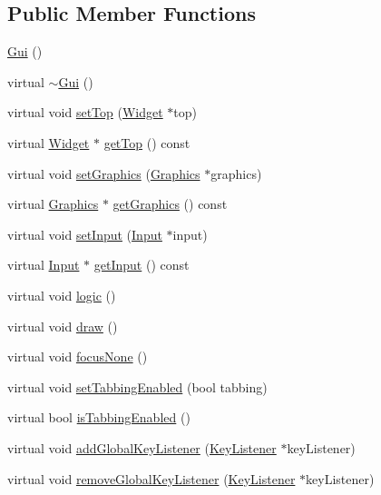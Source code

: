 \subsection*{Public Member Functions}
\begin{DoxyCompactItemize}
\item 
\hyperlink{classgcn_1_1Gui_ada0ae56b26099a1bbb70fc4bb8d77da1}{Gui} ()
\item 
virtual \hyperlink{classgcn_1_1Gui_a89c4b4fafd6bc85646f90f6d03826d48}{$\sim$\+Gui} ()
\item 
virtual void \hyperlink{classgcn_1_1Gui_a69ce39ec8962ae93f428a01ffec677de}{set\+Top} (\hyperlink{classgcn_1_1Widget}{Widget} $\ast$top)
\item 
virtual \hyperlink{classgcn_1_1Widget}{Widget} $\ast$ \hyperlink{classgcn_1_1Gui_a020f9c4e1f533797c294630725561377}{get\+Top} () const 
\item 
virtual void \hyperlink{classgcn_1_1Gui_af8583f7e03da6cfe63794d05e185e1c0}{set\+Graphics} (\hyperlink{classgcn_1_1Graphics}{Graphics} $\ast$graphics)
\item 
virtual \hyperlink{classgcn_1_1Graphics}{Graphics} $\ast$ \hyperlink{classgcn_1_1Gui_a1f17a7727de5c35dc19bc1452cf37017}{get\+Graphics} () const 
\item 
virtual void \hyperlink{classgcn_1_1Gui_a317e8327dc9aee497f2a9ce1033d16c7}{set\+Input} (\hyperlink{classgcn_1_1Input}{Input} $\ast$input)
\item 
virtual \hyperlink{classgcn_1_1Input}{Input} $\ast$ \hyperlink{classgcn_1_1Gui_a9382a845e764178c741264e1a3acf837}{get\+Input} () const 
\item 
virtual void \hyperlink{classgcn_1_1Gui_a66744ebd628213d574bb6a7010781b1f}{logic} ()
\item 
virtual void \hyperlink{classgcn_1_1Gui_ad231f982fb8182b16ecf11075054f4ac}{draw} ()
\item 
virtual void \hyperlink{classgcn_1_1Gui_a273aa54779ea4d7b2f58e4a6b5907f48}{focus\+None} ()
\item 
virtual void \hyperlink{classgcn_1_1Gui_a5d2546bd8c6dbe288640163b85e94194}{set\+Tabbing\+Enabled} (bool tabbing)
\item 
virtual bool \hyperlink{classgcn_1_1Gui_aa77a86f825e8d03ea461e58a449b0179}{is\+Tabbing\+Enabled} ()
\item 
virtual void \hyperlink{classgcn_1_1Gui_a871191dc235cf6dd81aa8151eccd21a6}{add\+Global\+Key\+Listener} (\hyperlink{classgcn_1_1KeyListener}{Key\+Listener} $\ast$key\+Listener)
\item 
virtual void \hyperlink{classgcn_1_1Gui_a34a9488faca688e56b25df4a7297f4ea}{remove\+Global\+Key\+Listener} (\hyperlink{classgcn_1_1KeyListener}{Key\+Listener} $\ast$key\+Listener)
\end{DoxyCompactItemize}
